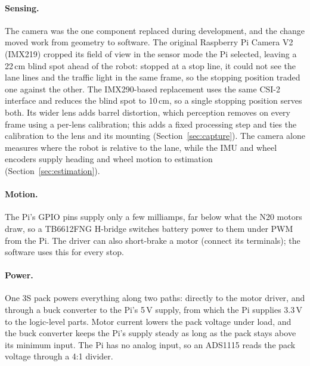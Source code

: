 \paragraph{Sensing.}
The camera was the one component replaced during development, and the change
moved work from geometry to software. The original Raspberry Pi Camera V2
(IMX219) cropped its field of view in the sensor mode the Pi selected, leaving
a 22\,cm blind spot ahead of the robot: stopped at a stop line, it could not
see the lane lines and the traffic light in the same frame, so the stopping
position traded one against the other. The IMX290-based replacement uses the
same CSI-2 interface and reduces the blind spot to 10\,cm, so a single stopping
position serves both. Its wider lens adds barrel distortion, which perception
removes on every frame using a per-lens calibration; this adds a fixed
processing step and ties the calibration to the lens and its mounting
(Section~\ref{sec:capture}). The camera alone measures where the robot is
relative to the lane, while the IMU and wheel encoders supply heading and wheel
motion to estimation (Section~\ref{sec:estimation}).

\paragraph{Motion.}
The Pi's GPIO pins supply only a few milliamps, far below what the N20 motors
draw, so a TB6612FNG H-bridge switches battery power to them under PWM from the
Pi. The driver can also short-brake a motor (connect its terminals); the
software uses this for every stop.

\paragraph{Power.}
One 3S pack powers everything along two paths: directly to the motor driver,
and through a buck converter to the Pi's 5\,V supply, from which the Pi
supplies 3.3\,V to the logic-level parts. Motor current lowers the pack voltage
under load, and the buck converter keeps the Pi's supply steady as long as the
pack stays above its minimum input. The Pi has no analog input, so an ADS1115
reads the pack voltage through a 4:1 divider.

